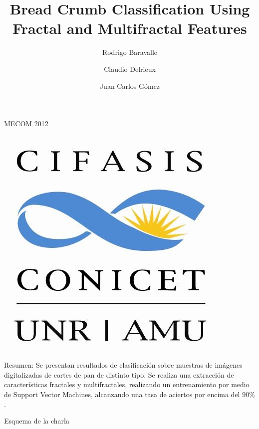 \documentclass{beamer}
\title[Bread Crumb Classification Using Fractal and Multifr. Features] %
{Bread Crumb Classification Using Fractal and Multifractal Features}
\author
{Rodrigo Baravalle\inst{1} \and Claudio Delrieux\inst{2} \and Juan Carlos G\'omez\inst{1}}
\institute
{
  \inst{1}%
  Laboratorio de Sistemas Din\'amicos y Procesamiento de Informaci\'on. FCEIA, Universidad Nacional de Rosario - CIFASIS - CONICET. \{baravalle,gomez\}@cifasis-conicet.gov.ar
  \and
  \inst{2}%
DIEC, Universidad Nacional del Sur - IIIE-CONICET. cad@uns.edu.ar
}
\date[Noviembre 2012] %
\begin{document}
\begin{frame}
  \titlepage
    \centering
    MECOM 2012
    \begin{center}
    \includegraphics[scale=0.06]{cifasislogo}
    \end{center}
\end{frame}

\begin{frame}
{\huge Resumen:}
Se presentan resultados de clasificaci\'on sobre muestras de im\'agenes digitalizadas de cortes de pan de distinto tipo. Se realiza una extracci\'on de caracter\'isticas fractales y multifractales, realizando un entrenamiento por medio de Support Vector Machines, alcanzando una tasa de aciertos por encima del $90\%$.
\end{frame}

\begin{frame}{Esquema de la charla}
  \tableofcontents[pausesections]
\end{frame}



\end{document}

